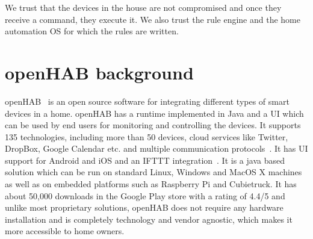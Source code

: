 \documentclass{sig-alternate-05-2015}
\begin{document}
We trust that the devices in the house are not compromised and once they receive a command, they execute it. We also trust the rule engine and the home automation OS for which the rules are written.

\section{\MakeLowercase{open}HAB background}
openHAB~\cite{openhab} is an open source software for integrating different types of smart devices in a home. openHAB has a runtime implemented in Java and a UI which can be used by end users for monitoring and controlling the devices. It supports 135 technologies, including more than 50 devices, cloud services like Twitter, DropBox, Google Calendar etc. and multiple communication protocols~\cite{openhabtech}. It has UI support for Android and iOS and an IFTTT integration~\cite{ifttt}. It is a java based solution which can be run on standard Linux, Windows and MacOS X machines as well as on embedded platforms such as Raspberry Pi and Cubietruck. It has about 50,000 downloads in the Google Play store with a rating of 4.4/5 and unlike most proprietary solutions, openHAB does not require any hardware installation and is completely technology and vendor agnostic, which makes it more accessible to home owners. 
\end{document}

